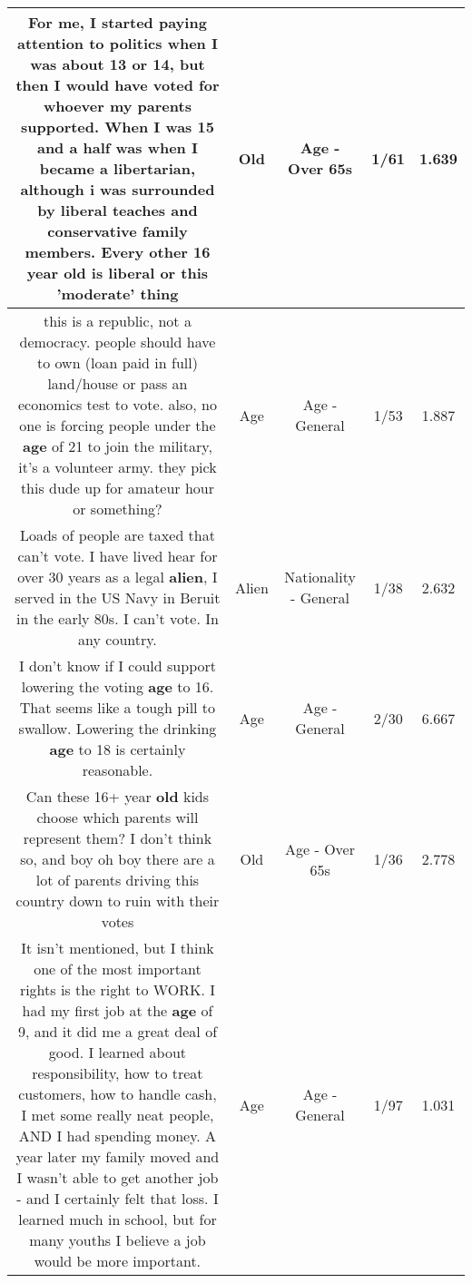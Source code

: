 \documentclass[11pt]{article}
\newlength\mylength
\begin{document}
\begin{center}
\begin{longtable}{|C{.65\mylength}|C{.30\mylength}|C{.12\mylength}|C{.12\mylength}|C{.12\mylength}|}
  \small For me, I started paying attention to politics when I was about 13 or 14, but then I would have voted for whoever my parents supported. When I was 15 and a half was when I became a libertarian, although i was surrounded by liberal teaches and conservative family members. Every other 16 year \textbf{old} is liberal or this 'moderate' thing\normalsize   & Old & Age - Over 65s & 1/61 & 1.639 \\  \hline
  \small this is a republic, not a democracy. people should have to own (loan paid in full) land/house or pass an economics test to vote. also, no one is forcing people under the \textbf{age} of 21 to join the military, it's a volunteer army. they pick this dude up for amateur hour or something?\normalsize   & Age & Age - General & 1/53 & 1.887 \\  \hline
  \small Loads of people are taxed that can't vote. I have lived hear for over 30 years as a legal \textbf{alien}, I served in the US Navy in Beruit in the early 80s. I can't vote. In any country.\normalsize   & Alien & Nationality - General & 1/38 & 2.632 \\  \hline
  \small I don't know if I could support lowering the voting \textbf{age} to 16. That seems like a tough pill to swallow. Lowering the drinking \textbf{age} to 18 is certainly reasonable.\normalsize   & Age & Age - General & 2/30 & 6.667 \\  \hline
  \small {} Can these 16+ year \textbf{old} kids choose which parents will represent them? I don't think so, and boy oh boy there are a lot of parents driving this country down to ruin with their votes\normalsize   & Old & Age - Over 65s & 1/36 & 2.778 \\  \hline
  \small It isn't mentioned, but I think one of the most important rights is the right to WORK.  I had my first job at the \textbf{age} of 9, and it did me a great deal of good.  I learned about responsibility, how to treat customers, how to handle cash, I met some really neat people, AND I had spending money.  A year later my family moved and I wasn't able to get another job - and I certainly felt that loss.  I learned much in school, but for many youths I believe a job would be more important.\normalsize   & Age & Age - General & 1/97 & 1.031 \\  \hline

\end{longtable}
\end{center}
\end{document}
